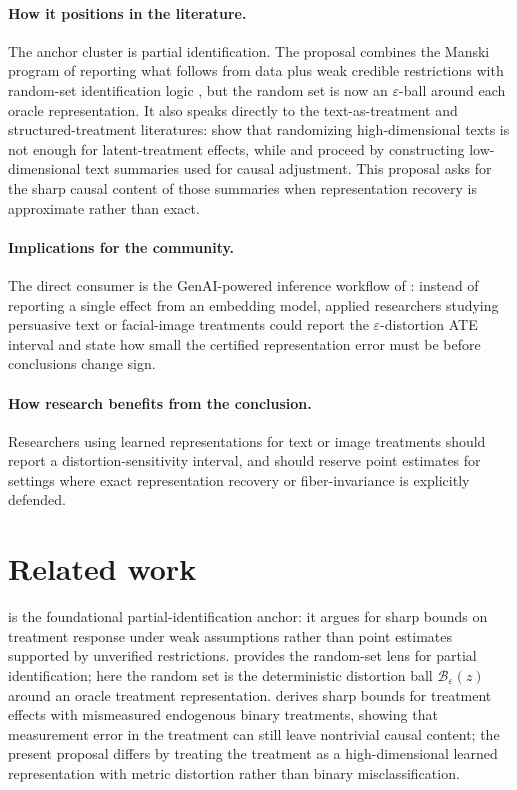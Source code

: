 \documentclass[11pt]{article}
\theoremstyle{definition}
\theoremstyle{plain}
\theoremstyle{remark}
\begin{document}
\paragraph{How it positions in the literature.}
The anchor cluster is partial identification. The proposal combines the Manski program of reporting what follows from data plus weak credible restrictions \citep{Manski1990} with random-set identification logic \citep{BeresteanuMolchanovMolinari2012}, but the random set is now an \(\varepsilon\)-ball around each oracle representation. It also speaks directly to the text-as-treatment and structured-treatment literatures: \citet{FongGrimmer2023} show that randomizing high-dimensional texts is not enough for latent-treatment effects, while \citet{VeitchSridharBlei2020} and \citet{RobertsStewartNielsen2020} proceed by constructing low-dimensional text summaries used for causal adjustment. This proposal asks for the sharp causal content of those summaries when representation recovery is approximate rather than exact.

\paragraph{Implications for the community.}
The direct consumer is the GenAI-powered inference workflow of \citet{ImaiNakamura2025GPI}: instead of reporting a single effect from an embedding model, applied researchers studying persuasive text or facial-image treatments could report the \(\varepsilon\)-distortion ATE interval and state how small the certified representation error must be before conclusions change sign.

\paragraph{How research benefits from the conclusion.}
Researchers using learned representations for text or image treatments should report a distortion-sensitivity interval, and should reserve point estimates for settings where exact representation recovery or fiber-invariance is explicitly defended.

\section{Related work}
\citet{Manski1990} is the foundational partial-identification anchor: it argues for sharp bounds on treatment response under weak assumptions rather than point estimates supported by unverified restrictions. \citet{BeresteanuMolchanovMolinari2012} provides the random-set lens for partial identification; here the random set is the deterministic distortion ball \(\mathcal B_\varepsilon(z)\) around an oracle treatment representation. \citet{Ura2018} derives sharp bounds for treatment effects with mismeasured endogenous binary treatments, showing that measurement error in the treatment can still leave nontrivial causal content; the present proposal differs by treating the treatment as a high-dimensional learned representation with metric distortion rather than binary misclassification.
\end{document}
